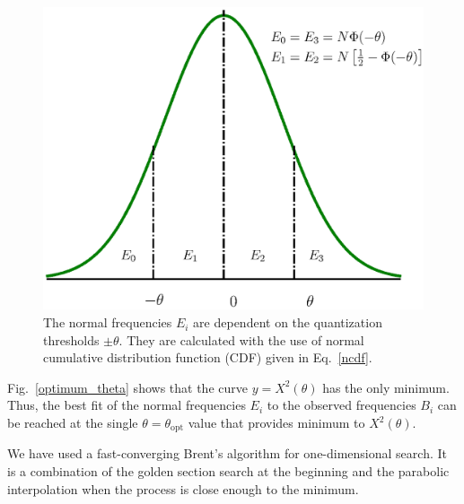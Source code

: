 \documentclass[letterpaper,twoside,12pt]{article}
\begin{document}
\begin{figure}[ht!]
  \begin{center}
  \includegraphics[width=30pc]{fig_npdf_areas.eps}
  \caption{\small The normal frequencies $E_i$ are dependent on the quantization thresholds $\pm\theta$. They are calculated with the use of normal cumulative distribution function (CDF) given in Eq.~\eqref{ncdf}.}
  \label{npdf_areas}
  \end{center}
\end{figure}

Fig.~\ref{optimum_theta} shows that the curve $y = X^2(\theta)$ has the only minimum. Thus, the best fit of the normal frequencies $E_i$ to the observed frequencies $B_i$ can be reached at the single $\theta=\theta_\text{opt}$ value that provides minimum to $X^2(\theta)$. 

We have used a fast-converging Brent's algorithm for one-dimensional search. It is a combination of the golden section search at the beginning and the parabolic interpolation when the process is close enough to the minimum.
\end{document}
